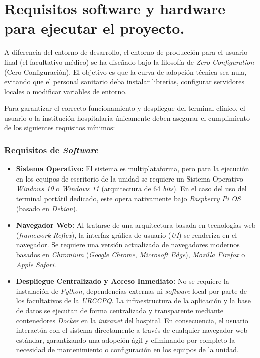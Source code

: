 \section{Requisitos software y hardware para ejecutar el proyecto.} \label{sec:requisitos}
A diferencia del entorno de desarrollo, el entorno de producción para el usuario final (el facultativo médico) se ha diseñado bajo la filosofía de \textit{Zero-Configuration} (Cero Configuración). El objetivo es que la curva de adopción técnica sea nula, evitando que el personal sanitario deba instalar librerías, configurar servidores locales o modificar variables de entorno. 

Para garantizar el correcto funcionamiento y despliegue del terminal clínico, el usuario o la institución hospitalaria únicamente deben asegurar el cumplimiento de los siguientes requisitos mínimos:

\subsubsection{Requisitos de \textit{Software}}
\begin{itemize}
    \item \textbf{Sistema Operativo:} El sistema es multiplataforma, pero para la ejecución en los equipos de escritorio de la unidad se requiere un Sistema Operativo \textit{Windows 10} o \textit{Windows 11} (arquitectura de 64 \textit{bits}). En el caso del uso del terminal portátil dedicado, este opera nativamente bajo \textit{Raspberry Pi OS} (basado en \textit{Debian}).
    \item \textbf{Navegador Web:} Al tratarse de una arquitectura basada en tecnologías web (\textit{framework Reflex}), la interfaz gráfica de usuario (\textit{UI}) se renderiza en el navegador. Se requiere una versión actualizada de navegadores modernos basados en \textit{Chromium} (\textit{Google Chrome}, \textit{Microsoft Edge}), \textit{Mozilla Firefox} o \textit{Apple Safari}.
    \item \textbf{Despliegue Centralizado y Acceso Inmediato:} No se requiere la instalación de \textit{Python}, dependencias externas ni \textit{software} local por parte de los facultativos de la \textit{URCCPQ}. La infraestructura de la aplicación y la base de datos se ejecutan de forma centralizada y transparente mediante contenedores \textit{Docker} en la \textit{intranet} del hospital. En consecuencia, el usuario interactúa con el sistema directamente a través de cualquier navegador web estándar, garantizando una adopción ágil y eliminando por completo la necesidad de mantenimiento o configuración en los equipos de la unidad.
\end{itemize}

